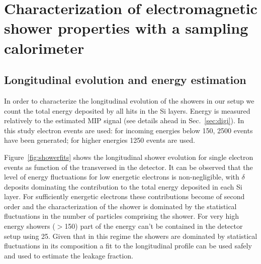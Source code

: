 %
%
%
\clearpage
\section{Characterization of electromagnetic shower properties with
a sampling calorimeter}
\label{sec:emshowerproperties}


\subsection{Longitudinal evolution and energy estimation}
\label{subsec:longevol}

In order to characterize the longitudinal evolution of the showers in
our setup we count the total energy deposited by all hits in the Si layers. 
Energy is measured relatively to the estimated MIP signal (see details
ahead in Sec.~\ref{sec:digi}).
In this study electron events are used: for incoming energies
below 150\GeV, 2500 events have been generated; for higher energies
1250 events are used.

Figure~\ref{fig:showerfits} shows the longitudinal shower evolution
for single electron events as function of the \Xnot transversed in the
detector.
It can be observed that the level of energy fluctuations for low
energetic electrons is non-negligible, with $\delta$ deposits
dominating the contribution to the total energy deposited in each Si
layer.
For sufficiently energetic electrons these contributions become of
second order and the characterization of the shower is dominated by
the statistical fluctuations in the number of particles comprising the shower.
For very high energy showers ($>$150\GeV) part of the energy can't be
contained in the detector setup using 25\Xnot. Given that in this
regime the showers are dominated by statistical fluctuations in its
composition a fit to the longitudinal profile can be used safely and
used to estimate the leakage fraction.

